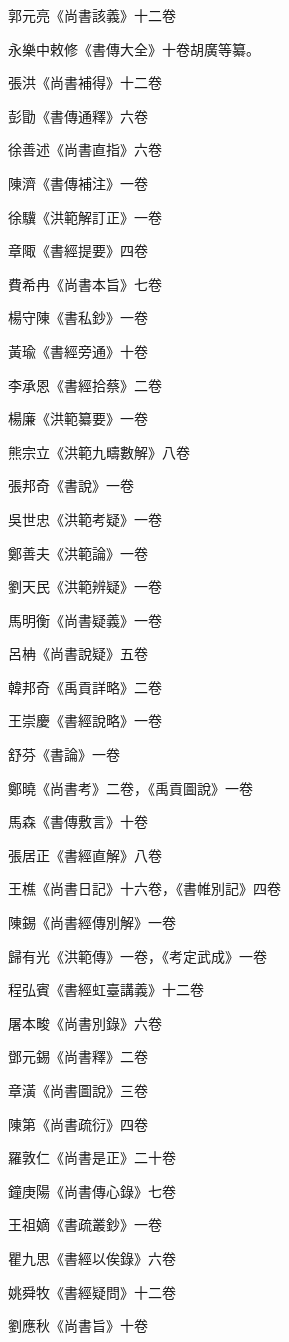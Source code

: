 郭元亮《尚書該義》十二卷

永樂中敕修《書傳大全》十卷胡廣等纂。

張洪《尚書補得》十二卷

彭勖《書傳通釋》六卷

徐善述《尚書直指》六卷

陳濟《書傳補注》一卷

徐驥《洪範解訂正》一卷

章陬《書經提要》四卷

費希冉《尚書本旨》七卷

楊守陳《書私鈔》一卷

黃瑜《書經旁通》十卷

李承恩《書經拾蔡》二卷

楊廉《洪範纂要》一卷

熊宗立《洪範九疇數解》八卷

張邦奇《書說》一卷

吳世忠《洪範考疑》一卷

鄭善夫《洪範論》一卷

劉天民《洪範辨疑》一卷

馬明衡《尚書疑義》一卷

呂柟《尚書說疑》五卷

韓邦奇《禹貢詳略》二卷

王崇慶《書經說略》一卷

舒芬《書論》一卷

鄭曉《尚書考》二卷，《禹貢圖說》一卷

馬森《書傳敷言》十卷

張居正《書經直解》八卷

王樵《尚書日記》十六卷，《書帷別記》四卷

陳錫《尚書經傳別解》一卷

歸有光《洪範傳》一卷，《考定武成》一卷

程弘賓《書經虹臺講義》十二卷

屠本畯《尚書別錄》六卷

鄧元錫《尚書釋》二卷

章潢《尚書圖說》三卷

陳第《尚書疏衍》四卷

羅敦仁《尚書是正》二十卷

鐘庚陽《尚書傳心錄》七卷

王祖嫡《書疏叢鈔》一卷

瞿九思《書經以俟錄》六卷

姚舜牧《書經疑問》十二卷

劉應秋《尚書旨》十卷

